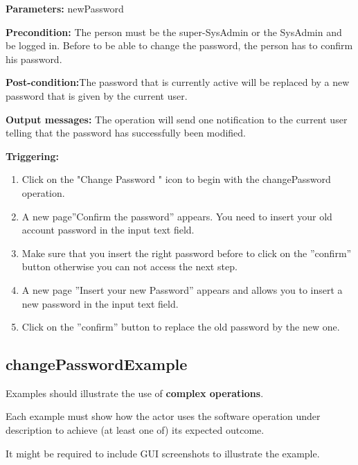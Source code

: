 \begin{description}

\item \textbf{Parameters:} newPassword
\item \textbf{Precondition:} The person must be the super-SysAdmin or the
SysAdmin and be logged in. Before to be able to change the password, the person has to confirm his password.
\item \textbf{Post-condition:}The password that is currently active will be
replaced by a new password that is given by the current user.
\item \textbf{Output messages:} The operation will send one notification to the
current user telling that the password  has successfully been modified.


\item \textbf{Triggering:}
\begin{enumerate}
\item Click on the "Change Password " icon to begin with the changePassword
operation.
\item A new page''Confirm the password'' appears. You need to insert your old
account password in the input text field. 
\item Make sure that you insert the right password before to click on the
''confirm'' button otherwise you can not access the next step.
\item A new page ''Insert your new Password'' appears and allows you to
insert a new password in the input text field.
\item Click on the ''confirm'' button to replace the old password by the new
one.

\end{enumerate}

 
\end{description}

 
\subsection{changePasswordExample}
Examples should illustrate the use of \textbf{complex operations}.

Each example must show how the actor uses the software operation under
description to achieve (at least one of) its expected outcome.

It might be required to include GUI screenshots to illustrate the example.





